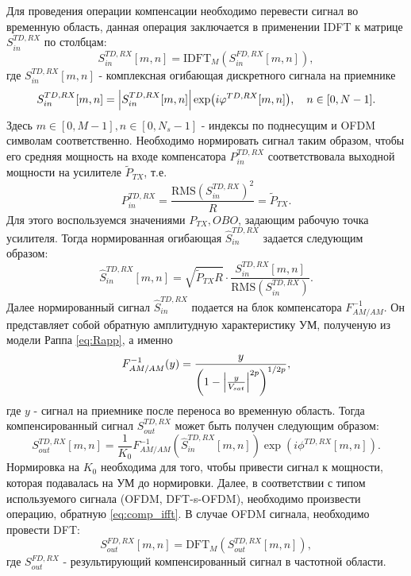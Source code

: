 Для проведения операции компенсации необходимо перевести сигнал во временную
область, данная операция заключается в применении IDFT к матрице $S^{TD,
RX}_{in}$ по столбцам:
\begin{equation}
    S^{TD, RX}_{in}[m, n] = \text{IDFT}_{M}\left(S^{FD, RX}_{in}[m, n]\right),
    \label{eq:comp_ifft}
\end{equation}
где $S^{TD, RX}_{in}[m, n]$ - комплексная огибающая дискретного сигнала на
приемнике
\begin{equation}
    S^{TD, RX}_{in}[m,n] = \abs{S^{TD,RX}_{in}[m,n]}\exp(i\varphi^{TD, RX}[m,n]),\quad n \in[0, N-1].
\end{equation}
Здесь $m \in [0, M-1],n \in [0, N_s-1]$ - индексы по поднесущим и OFDM
символам соответственно. Необходимо нормировать сигнал таким образом, чтобы
его средняя мощность на входе компенсатора $P^{TD, RX}_{in}$
соответствовала выходной мощности на усилителе $\tilde{P}_{TX}$, т.е.
\begin{equation}
    P^{TD, RX}_{in} = \frac{\text{RMS}\left(S^{TD, RX}_{in}\right)^2}{R} = \tilde{P}_{TX}.
\end{equation}
Для этого воспользуемся значениями $P_{TX}, OBO$, задающим рабочую точка
усилителя. Тогда нормированная огибающая $\hat{S}^{TD, RX}_{in}$ задается
следующим образом:
\begin{equation}
    \hat{S}^{TD, RX}_{in}[m, n] = \sqrt{\tilde{P}_{TX}R} \cdot
    \frac{S^{TD, RX}_{in}[m, n]}{\text{RMS}\left(S^{TD, RX}_{in}\right)}.
\end{equation}
Далее нормированный сигнал $\hat{S}^{TD, RX}_{in}$ подается на блок
компенсатора $F^{-1}_{AM/AM}$. Он представляет собой обратную амплитудную
характеристику УМ, полученую из модели Раппа \ref{eq:Rapp}, а именно
\begin{equation}
    \displaystyle
    F^{-1}_{AM/AM}(y) = 
       \frac{ y}{\left( 1 - \abs{\frac{y}{V_{sat}}}^{2p}\right)^{1/2p}},
    \label{eq:invRapp}
\end{equation}
где $y$ - сигнал на приемнике после переноса во временную область.
Тогда компенсированный сигнал $S^{TD, RX}_{out}$ может быть получен следующим образом:
\begin{equation}
    S^{TD, RX}_{out}[m, n] =
    \frac{1}{K_0}F^{-1}_{AM/AM}\left(\hat{S}^{TD, RX}_{in}[m, n]\right)
    \exp(i\phi^{TD, RX}[m, n]).
\end{equation}
Нормировка на $K_0$ необходима для того, чтобы привести сигнал к мощности,
которая подавалась на УМ до нормировки.
Далее, в соответствии с типом используемого сигнала (OFDM, DFT-s-OFDM),
необходимо произвести операцию, обратную \ref{eq:comp_ifft}. В случае OFDM
сигнала, необходимо провести DFT:
\begin{equation}
    S^{FD, RX}_{out}[m, n] = \text{DFT}_M\left(S^{TD, RX}_{out}[m, n]\right),
    \label{eq:ofdm_final_dft}
\end{equation}
где $S^{FD, RX}_{out}$ - результирующий компенсированный сигнал в частотной
области. 

